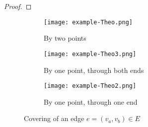 \documentclass[review]{elsarticle}
\newcommand{\cP}{{\mathcal P}}
\newcommand{\dlt}{{\delta}}
\theoremstyle{definition}
\begin{document}
\begin{proof}
\end{proof}
\begin{figure}
	\begin{subfigure}{0.33\textwidth}
	\centering
   	\texttt{[image: example-Theo.png]}
   	\caption{By two points}
   	\label{fig:teoex-a}
	\end{subfigure}
	\begin{subfigure}{0.33\textwidth}
	\centering
   	\texttt{[image: example-Theo3.png]}
   	\caption{By one point, through both ends}
   	\label{fig:teoex-b}
	\end{subfigure}
 	\begin{subfigure}{0.33\textwidth}
	\centering
   	\texttt{[image: example-Theo2.png]}
   	\caption{By one point, through one end}
   	\label{fig:teoex-c}
	\end{subfigure}
	\caption{Covering of an edge $e=(v_a,v_b)\in E$}
	\label{fig:teoex}
\end{figure}
\end{document}
